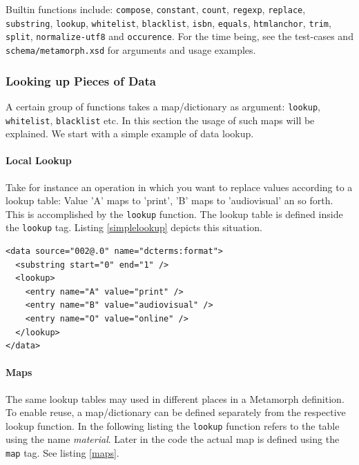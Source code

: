 \documentclass[12pt,a4paper]{article}
\begin{document}
Builtin functions include:
{\tt compose}, {\tt constant}, {\tt count}, {\tt regexp}, {\tt replace}, {\tt substring}, {\tt lookup}, {\tt whitelist}, {\tt blacklist}, {\tt isbn}, {\tt equals}, {\tt htmlanchor}, {\tt trim}, {\tt split}, {\tt normalize-utf8} and {\tt occurence}. For the time being, see the test-cases and {\tt schema/metamorph.xsd} for arguments and usage examples.



\subsubsection{Looking up  Pieces of Data}\label{lookup}

A certain group of functions takes a map/dictionary as argument: {\tt lookup}, {\tt whitelist}, {\tt blacklist} etc.
In this section the usage of such maps will be explained. We start with a simple example of data lookup.

\paragraph{Local Lookup}

Take for instance an operation in which you want to replace values according to a lookup table: Value 'A' maps to 'print', 'B' maps to 'audiovisual' an so forth. This is accomplished by the {\tt lookup} function. The lookup table is defined inside the {\tt lookup} tag. Listing \ref{simplelookup} depicts this situation.

\begin{lstlisting}[float=htb, label=simplelookup,caption=Performing a simple lookup operation]
<data source="002@.0" name="dcterms:format">
  <substring start="0" end="1" />
  <lookup>
    <entry name="A" value="print" />
    <entry name="B" value="audiovisual" />
    <entry name="O" value="online" />
  </lookup>
</data>	
\end{lstlisting}

\paragraph{Maps}

The same lookup tables may used in different places in a Metamorph definition. To enable reuse, a map/dictionary can be defined separately from the respective lookup function. In the following listing the {\tt lookup} function refers to the table using the name {\it material}. Later in the code the actual map is defined using the {\tt map} tag. See listing \ref{maps}.
\end{document}
